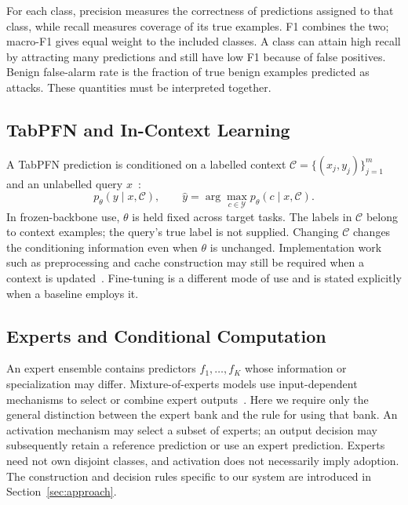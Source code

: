 \documentclass[sigconf,anonymous,pbalance]{acmart}
\newcommand{\ctx}{\mathcal{C}}
\begin{document}
For each class, precision measures the correctness of predictions assigned to that class, while recall measures coverage of its true examples. F1 combines the two; macro-F1 gives equal weight to the included classes. A class can attain high recall by attracting many predictions and still have low F1 because of false positives. Benign false-alarm rate is the fraction of true benign examples predicted as attacks. These quantities must be interpreted together.

\subsection{TabPFN and In-Context Learning}
\label{sec:tabpfn}
A TabPFN prediction is conditioned on a labelled context $\ctx=\{(x_j,y_j)\}_{j=1}^{m}$ and an unlabelled query $x$~\cite{hollmann2023tabpfn,hollmann2025tabpfn}:
\begin{equation}
 p_{\theta}(y\mid x,\ctx),\qquad
 \hat y=\arg\max_{c\in\mathcal{Y}}p_{\theta}(c\mid x,\ctx).
 \label{eq:icl}
\end{equation}
In frozen-backbone use, $\theta$ is held fixed across target tasks. The labels in $\ctx$ belong to context examples; the query's true label is not supplied. Changing $\ctx$ changes the conditioning information even when $\theta$ is unchanged.
Implementation work such as preprocessing and cache construction may still be required when a context is updated~\cite{grinsztajn2026tabpfn3}. Fine-tuning is a different mode of use and is stated explicitly when a baseline employs it.

\subsection{Experts and Conditional Computation}
An expert ensemble contains predictors $f_1,\ldots,f_K$ whose information or specialization may differ. Mixture-of-experts models use input-dependent mechanisms to select or combine expert outputs~\cite{jacobs1991adaptive}. Here we require only the general distinction between the expert bank and the rule for using that bank. An activation mechanism may select a subset of experts; an output decision may subsequently retain a reference prediction or use an expert prediction. Experts need not own disjoint classes, and activation does not necessarily imply adoption. The construction and decision rules specific to our system are introduced in Section~\ref{sec:approach}.
\end{document}
